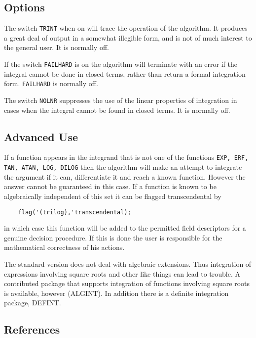 \subsection{Options}

The switch {\tt TRINT} when on will trace the operation of the algorithm. It
produces a great deal of output in a somewhat illegible form, and is not
of much interest to the general user. It is normally off.

If the switch {\tt FAILHARD} is on the algorithm will terminate with an
error if the integral cannot be done in closed terms, rather than return a
formal integration form. {\tt FAILHARD} is normally off.

The switch {\tt NOLNR} suppresses the use of the linear properties of
integration in cases when the integral cannot be found in closed terms.
It is normally off.

\subsection{Advanced Use}

If a function appears in the integrand that is not one of the functions
{\tt EXP, ERF, TAN, ATAN, LOG, DILOG}
then the algorithm will make an
attempt to integrate the argument if it can, differentiate it and reach a
known function.  However the answer cannot be guaranteed in this case.  If
a function is known to be algebraically independent of this set it can be
flagged transcendental by
\begin{verbatim}
	flag('(trilog),'transcendental);
\end{verbatim}
in which case this function will be added to the permitted field
descriptors for a genuine decision procedure. If this is done the user is
responsible for the mathematical correctness of his actions.

The standard version does not deal with algebraic extensions. Thus
integration of expressions involving square roots and other like things
can lead to trouble.  A contributed package that supports integration of
functions involving square roots is available, however
(ALGINT).
In addition there is a definite integration
package, DEFINT.

\subsection{References}

